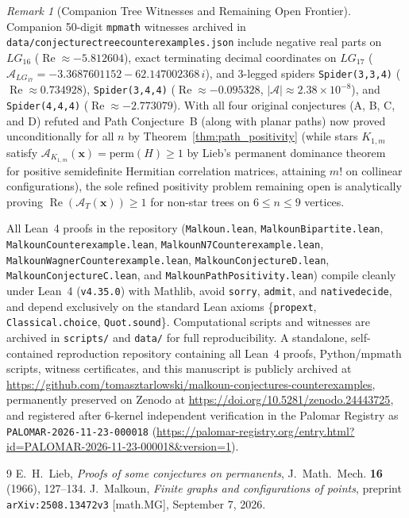 \documentclass[11pt]{amsart}
\renewcommand{\_}{\origunderscore\penalty0\relax}
\theoremstyle{plain}
\theoremstyle{definition}
\theoremstyle{remark}
\newtheorem{remark}[theorem]{Remark}
\DeclareMathOperator{\RePart}{Re}
\begin{document}
\begin{remark}[Companion Tree Witnesses and Remaining Open Frontier]
Companion 50-digit \texttt{mpmath} witnesses archived in \texttt{data/conjecture\_c\_tree\_counterexamples.json} include negative real parts on $LG_{16}$ ($\RePart \approx -5.812604$), exact terminating decimal coordinates on $LG_{17}$ ($\mathcal{A}_{LG_{17}} = -3.3687601152 - 62.147002368\,i$), and 3-legged spiders \texttt{Spider(3,3,4)} ($\RePart \approx 0.734928$), \texttt{Spider(3,4,4)} ($\RePart \approx -0.095328$, $|\mathcal{A}| \approx 2.38 \times 10^{-8}$), and \texttt{Spider(4,4,4)} ($\RePart \approx -2.773079$). With all four original conjectures (A, B, C, and D) refuted and Path Conjecture~B (along with planar paths) now proved unconditionally for all $n$ by Theorem~\ref{thm:path_positivity} (while stars $K_{1,m}$ satisfy $\mathcal{A}_{K_{1,m}}(\mathbf{x}) = \mathrm{perm}(H) \ge 1$ by Lieb's permanent dominance theorem~\cite{Lieb1966} for positive semidefinite Hermitian correlation matrices, attaining $m!$ on collinear configurations), the sole refined positivity problem remaining open is analytically proving $\RePart(\mathcal{A}_T(\mathbf{x})) \ge 1$ for non-star trees on $6 \le n \le 9$ vertices.
\end{remark}

All Lean~4 proofs in the repository (\texttt{Malkoun.lean}, \texttt{MalkounBipartite.lean}, \texttt{MalkounCounterexample.lean}, \texttt{MalkounN7Counterexample.lean}, \texttt{MalkounWagnerCounterexample.lean}, \texttt{MalkounConjectureD.lean}, \texttt{MalkounConjectureC.lean}, and \texttt{MalkounPathPositivity.lean}) compile cleanly under Lean~4 (\texttt{v4.35.0}) with Mathlib, avoid \texttt{sorry}, \texttt{admit}, and \texttt{native\_decide}, and depend exclusively on the standard Lean axioms \{\texttt{propext}, \texttt{Classical.choice}, \texttt{Quot.sound}\}. Computational scripts and witnesses are archived in \texttt{scripts/} and \texttt{data/} for full reproducibility. A standalone, self-contained reproduction repository containing all Lean~4 proofs, Python/mpmath scripts, witness certificates, and this manuscript is publicly archived at \url{https://github.com/tomasztarlowski/malkoun-conjectures-counterexamples}, permanently preserved on Zenodo at \url{https://doi.org/10.5281/zenodo.24443725}, and registered after 6-kernel independent verification in the Palomar Registry as \texttt{PALOMAR-2026-11-23-000018} (\url{https://palomar-registry.org/entry.html?id=PALOMAR-2026-11-23-000018&version=1}).

\begin{thebibliography}{9}
E.~H.~Lieb, \emph{Proofs of some conjectures on permanents}, J.~Math.~Mech. \textbf{16} (1966), 127--134.
J.~Malkoun, \emph{Finite graphs and configurations of points}, preprint \texttt{arXiv:2508.13472v3} [math.MG], September 7, 2026.
\end{thebibliography}
\end{document}
